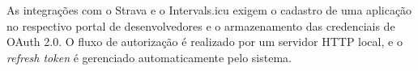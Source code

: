 As integrações com o Strava e o Intervals.icu exigem o cadastro de uma
aplicação no respectivo portal de desenvolvedores e o armazenamento das
credenciais de OAuth 2.0. O fluxo de autorização é realizado por um servidor
HTTP local, e o \textit{refresh token} é gerenciado automaticamente pelo
sistema.

